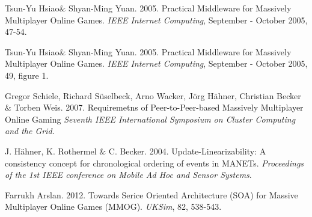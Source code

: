 \begin{thebibliography}{9}

	Tsun-Yu Hsiao$\&$ Shyan-Ming Yuan.
	2005.	
 	Practical Middleware for Massively Multiplayer Online Games.
	\emph{IEEE Internet Computing},
	September - October 2005, 47-54.

	Tsun-Yu Hsiao$\&$ Shyan-Ming Yuan.
	2005.	
 	Practical Middleware for Massively Multiplayer Online Games.
	\emph{IEEE Internet Computing},
	September - October 2005, 49, figure 1.

	Gregor Schiele, Richard S\"{u}selbeck, Arno Wacker, J\"{o}rg H\"{a}hner, Christian Becker $\&$ Torben Weis.
	2007.	
 	Requiremetns of Peer-to-Peer-based Massively Multiplayer Online Gaming
	\emph{Seventh IEEE International Symposium on Cluster Computing and the Grid}.

	J. H\"{a}hner, K. Rothermel $\&$ C. Becker.
	2004.	
 	Update-Linearizability: A consistency concept for chronological ordering of events in MANETs. 
	\emph{Proceedings of the 1st IEEE conference on Mobile Ad Hoc and Sensor Systems}.

	Farrukh Arslan.
	2012.	
 	Towards Serice Oriented Architecture (SOA) for Massive Multiplayer Online Games (MMOG).
	\emph{UKSim},
	82, 538-543.
\end{thebibliography}